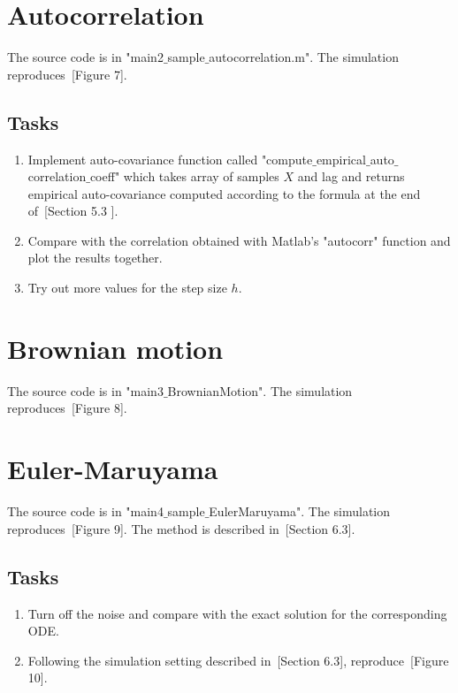 \documentclass{scrartcl}
\begin{document}
\section{Autocorrelation}

The source code is in "main2$\_$sample$\_$autocorrelation.m". The simulation reproduces~\cite{sanz2014markov}[Figure 7].

\subsection{Tasks}
\begin{enumerate}
\item Implement auto-covariance function called "compute$\_$empirical$\_$auto$\_$correlation$\_$coeff" which takes array of samples $X$ and lag and returns empirical auto-covariance computed according to the formula at the end of~\cite{sanz2014markov}[Section 5.3 ].
\item Compare with the correlation obtained with Matlab's "autocorr" function and plot the results together.
\item Try out more values for the step size $h$.
\end{enumerate}


\section{Brownian motion}

The source code is in "main3$\_$BrownianMotion". The simulation reproduces~\cite{sanz2014markov}[Figure 8].



\section{Euler-Maruyama}

The source code is in "main4$\_$sample$\_$EulerMaruyama". The simulation reproduces~\cite{sanz2014markov}[Figure 9]. The method is described in~\cite{sanz2014markov}[Section 6.3].

\subsection{Tasks}
\begin{enumerate}
\item Turn off the noise and compare with the exact solution for the corresponding ODE. 
\item Following the simulation setting described in~\cite{sanz2014markov}[Section 6.3], reproduce~\cite{sanz2014markov}[Figure 10].
\end{enumerate}
\end{document}
